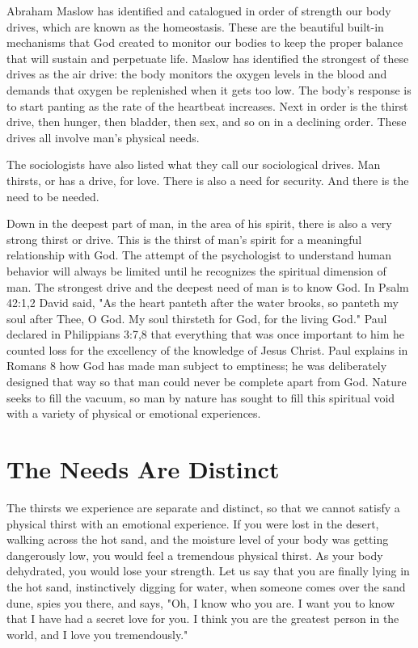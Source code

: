 Abraham Maslow has identified and catalogued in order of strength our body drives, which are known as the homeostasis. These are the beautiful built-in mechanisms that God created to monitor our bodies to keep the proper balance that will sustain and perpetuate life. Maslow has identified the strongest of these drives as the air drive: the body monitors the oxygen levels in the blood and demands that oxygen be replenished when it gets too low. The body's response is to start panting as the rate of the heartbeat increases. Next in order is the thirst drive, then hunger, then bladder, then sex, and so on in a declining order. These drives all involve man's physical needs. 

The sociologists have also listed what they call our sociological drives. Man thirsts, or has a drive, for love. There is also a need for security. And there is the need to be needed. 

Down in the deepest part of man, in the area of his spirit, there is also a very strong thirst or drive. This is the thirst of man's spirit for a meaningful relationship with God. The attempt of the psychologist to understand human behavior will always be limited until he recognizes the spiritual dimension of man. The strongest drive and the deepest need of man is to know God. In Psalm 42:1,2 David said, "As the heart panteth after the water brooks, so panteth my soul after Thee, O God. My soul thirsteth for God, for the living God." Paul declared in Philippians 3:7,8 that everything that was once important to him he counted loss for the excellency of the knowledge of Jesus Christ. Paul explains in Romans 8 how God has made man subject to emptiness; he was deliberately designed that way so that man could never be complete apart from God. Nature seeks to fill the vacuum, so man by nature has sought to fill this spiritual void with a variety of physical or emotional experiences. 

\section*{The Needs Are Distinct}

The thirsts we experience are separate and distinct, so that we cannot satisfy a physical thirst with an emotional experience. If you were lost in the desert, walking across the hot sand, and the moisture level of your body was getting dangerously low, you would feel a tremendous physical thirst. As your body dehydrated, you would lose your strength. Let us say that you are finally lying in the hot sand, instinctively digging for water, when someone comes over the sand dune, spies you there, and says, "Oh, I know who you are. I want you to know that I have had a secret love for you. I think you are the greatest person in the world, and I love you tremendously." 


